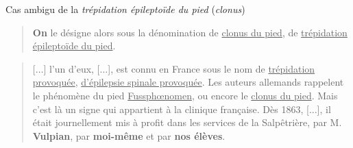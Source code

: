 \documentclass[xcolor={table,usenames,dvipsnames}]{beamer}
\begin{document}
	\begin{frame}{Cas ambigu de la \textit{trépidation épileptoïde du pied} (\textit{clonus})}
		
		\begin{quote}
		\textbf{On} le désigne alors sous la dénomination de \og{}\underline{clonus du pied}\fg{}, de \og{}\underline{trépidation épileptoïde du pied}\fg{}.
		\end{quote}
		\begin{flushright}
			\small
			\citep{babinski1934oeuvre}
		\end{flushright}
		
		
		
		\begin{quote}
			\small
			[$\dots$] l'un d'eux, [$\dots$], est
			connu en France sous le nom de \underline{trépidation provoquée},	\underline{d'épilepsie spinale provoquée}. Les auteurs allemands rappelent le phénomène du pied ‭{\underline{Fussph\oe{}nomen}}, ou encore le \underline{clonus du pied}.
			Mais c'est là un signe qui appartient ‭à la clinique française. Dès ‭1863, [$\dots$], il ‭était journellement mis ‭à profit dans les services de la Salpêtrière, par M. \textbf{Vulpian}, par \textbf{moi-même} et par \textbf{nos ‭élèves}.
		\end{quote}
		
		\begin{flushright}
			\small
			\citep{brissaud1893}
		\end{flushright}
%	
	\end{frame}
\end{document}
